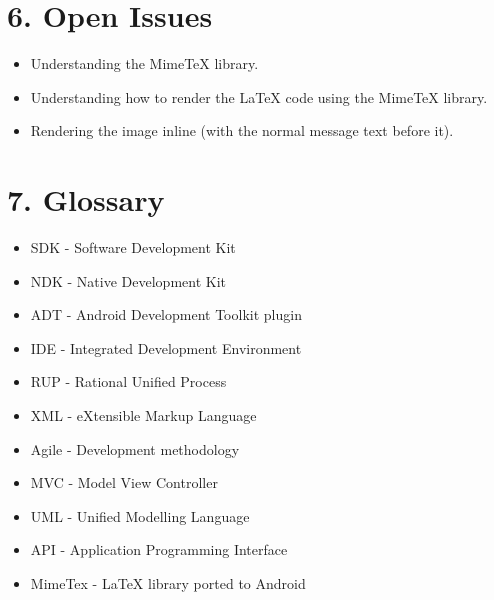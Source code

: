 \documentclass[29pt,a4paper]{moderncv}
\begin{document}
	\section*{\textbf{6. Open Issues}}
	\vspace{4mm}
		\begin{itemize}
			\item Understanding the MimeTeX library.
			\item Understanding how to render the LaTeX code using the MimeTeX library.
			\item Rendering the image inline (with the normal message text before it).
			
		\end{itemize}
	\vspace{5mm}
	
	\section*{\textbf{7. Glossary}}
	\vspace{4mm}
		\begin{itemize}
			\item SDK - Software Development Kit
			\item NDK - Native Development Kit
			\item ADT - Android Development Toolkit plugin
			\item IDE - Integrated Development Environment
			\item RUP - Rational Unified Process
			\item XML - eXtensible Markup Language
			\item Agile - Development methodology
			\item MVC - Model View Controller
			\item UML - Unified Modelling Language
			\item API - Application Programming Interface
			\item MimeTex - LaTeX library ported to Android
			
		\end{itemize}
	\vspace{5mm}
\end{document}
